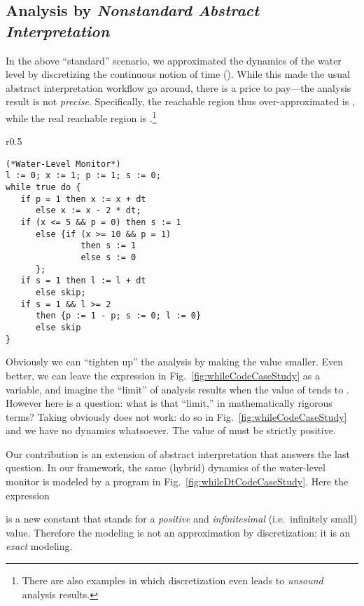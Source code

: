 \documentclass[envcountsect,orivec]{llncs} \pdfoutput=1
\theoremstyle{definition}
\begin{document}
\subsection{Analysis by \emph{Nonstandard Abstract
  Interpretation}}\label{subsec:waterLevelDt}
In the above ``standard'' scenario, we approximated the 
dynamics of the water level by discretizing the continuous notion of
time (). While this made the usual abstract interpretation
workflow go around, 
there is a price to pay---the analysis result is not
\emph{precise}. Specifically, the reachable region thus over-approximated is
, while the real reachable region is .\footnote{There are also examples in which 
discretization even leads to \emph{unsound} analysis results.}

\begin{wrapfigure}[13]{r}{0.5\hsize}
\vspace{-1em}
 \begingroup
 \fontsize{7pt}{8pt}\selectfont
\begin{verbatim}
(*Water-Level Monitor*)
l := 0; x := 1; p := 1; s := 0;
while true do {
   if p = 1 then x := x + dt 
      else x := x - 2 * dt;
   if (x <= 5 && p = 0) then s := 1 
      else {if (x >= 10 && p = 1) 
               then s := 1 
               else s := 0
      };
   if s = 1 then l := l + dt
      else skip;
   if s = 1 && l >= 2
      then {p := 1 - p; s := 0; l := 0}
      else skip
}
\end{verbatim}
\endgroup 
\vspace{-1.7em}
\caption{Water-level monitor in }
\label{fig:whileDtCodeCaseStudy}
\end{wrapfigure}
Obviously we can ``tighten up'' the analysis by making the value  smaller.
Even better, we can leave the expression  in
Fig.~\ref{fig:whileCodeCaseStudy} as a variable, and imagine the ``limit'' of
analysis results when the value of  tends to . However here is
a question: what is that ``limit,'' in mathematically rigorous terms?
Taking  obviously does not work: do so in
Fig.~\ref{fig:whileCodeCaseStudy}
and we have no dynamics whatsoever. The value of  must be strictly positive.

Our contribution is an extension of abstract interpretation that answers
the last question. In our framework, the same (hybrid) dynamics of
the water-level monitor is modeled
by a program in Fig.~\ref{fig:whileDtCodeCaseStudy}. Here the expression

is a new constant that stands for a \emph{positive} and \emph{infinitesimal}
(i.e.\ infinitely small) value. Therefore the modeling is not an
approximation by discretization; it is an \emph{exact} modeling.
\end{document}
